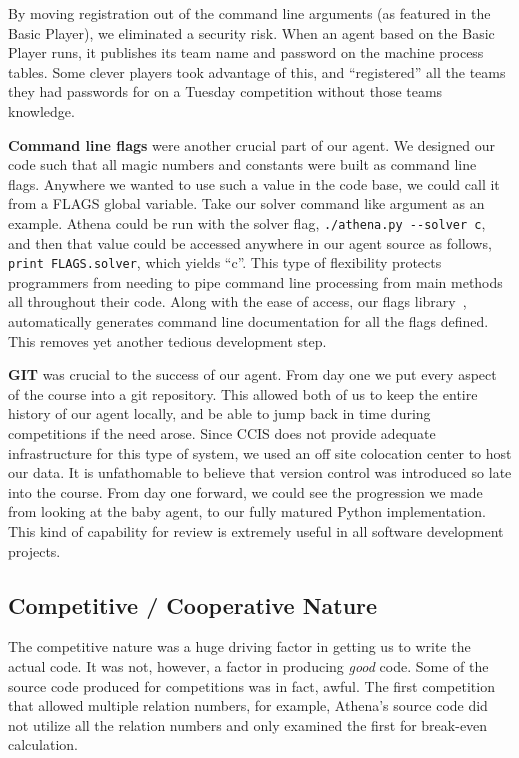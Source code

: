 \documentclass[letterpaper,12pt,oneside]{article}
\begin{document}
By moving registration out of the command line arguments (as featured in the 
Basic Player), we eliminated a security risk. When an agent based on the Basic
Player runs, it publishes its team name and password on the machine process
tables. Some clever players took advantage of this, and ``registered'' all the
teams they had passwords for on a Tuesday competition without those teams
knowledge.

\textbf{Command line flags} were another crucial part of our agent. We designed
our code such that all magic numbers and constants were built as command line
flags. Anywhere we wanted to use such a value in the code base, we could call it
from a FLAGS global variable. Take our solver command like argument as an
example. Athena could be run with the solver flag,
\verb=./athena.py --solver c=, and then that value could be accessed anywhere
in our agent source as follows, \verb=print FLAGS.solver=, which yields ``c''.
This type of flexibility protects programmers from needing to pipe command line
processing from main methods all throughout their code. Along with the ease of
access, our flags library~\cite{gflags:website}, automatically generates
command line documentation for all the flags defined. This removes yet another
tedious development step.

\textbf{GIT} was crucial to the success of our agent. From day one we put every
aspect of the course into a git repository. This allowed both of us to keep the
entire history of our agent locally, and be able to jump back in time during
competitions if the need arose. Since CCIS does not provide adequate
infrastructure for this type of system, we used an off site colocation center to
host our data. It is unfathomable to believe that version control was introduced
so late into the course. From day one forward, we could see the progression we
made from looking at the baby agent, to our fully matured Python implementation.
This kind of capability for review is extremely useful in all software
development projects.

\subsection{Competitive / Cooperative Nature}

The competitive nature was a huge driving factor in getting us to write
the actual code. It was not, however, a factor in producing {\em good}
code. Some of the source code produced for competitions was in fact, awful. The
first competition that allowed multiple relation numbers, for example, Athena's
source code did not utilize all the relation numbers and only examined the
first for break-even calculation.
\end{document}
